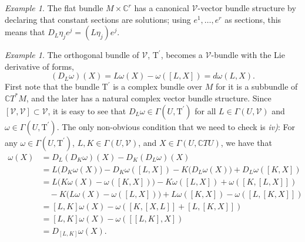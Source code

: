 \documentclass[11pt]{amsart}
\newcommand{\C}{\mathbb{C}}
\theoremstyle{definition}
\theoremstyle{remark}
\newtheorem{exa}[defn]{Example}
\theoremstyle{plain}
\begin{document}
\begin{exa} The flat bundle $M \times \C^r$ has a canonical $\mathcal{V}$-vector bundle structure by 
declaring that constant sections are solutions; using $e^1, \dots, e^r$ as sections, 
this means that $D_{L} \eta_j e^j = (L \eta_j) e^j$.
\end{exa}

\begin{exa}
The orthogonal bundle of $\mathcal{V}$, $\mathrm{T}^\prime$, becomes a $\mathcal{V}$-bundle with the Lie derivative of forms, 
\[ (D_{L} \omega) (X) = L \omega (X) - \omega ([L, X]) = d\omega (L, X). \]
%
First note that the bundle $\mathrm{T}^\prime$ is a complex bundle over $M$ for it is a subbundle of $\mathbb{C}T^\ast M$, and the later has a natural complex vector bundle structure.
Since $[\mathcal{V},\mathcal{V}]\subset \mathcal{V}$, it is easy to see that $D_L\omega \in \Gamma(U,\mathrm{T}^\prime)$ for all $L \in \Gamma(U, \mathcal{V})$ and $\omega \in \Gamma(U,\mathrm{T}^\prime)$. The only non-obvious condition that we need to check is \textit{iv)}: For any $\omega \in \Gamma(U, \mathrm{T}^\prime)$, $L,K \in \Gamma(U,\mathcal{V})$, and $X \in \Gamma (U, \mathbb{C}TU)$, we have that
%
\begin{align*}
	[D_L,D_K]\omega (X) & = D_L(D_K\omega)(X) - D_K(D_L\omega)(X)\\
	&=   L \big(D_K\omega (X)\big) - D_K\omega ([L, X]) -  K\big( D_L\omega (X)\big) + D_L\omega ([K, X]) \\
	&= L \big( K \omega (X) - \omega ([K, X]) \big) - K\omega([L,X]) + \omega([K,[L,X]]) \\
	&\quad - K\big( L\omega(X) - \omega([L,X]) \big) + L\omega([K,X]) - \omega([L,[K,X]]) \\
	&= [L,K]\omega(X) - \omega([K,[X,L]] + [L,[K,X]]) \\
	&= [L,K]\omega(X) - \omega([[L,K],X]) \\
	&= D_{[L,K]}\omega(X).
\end{align*}
\end{exa}
%
\end{document}
